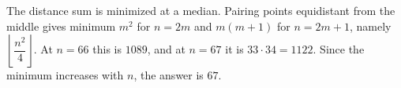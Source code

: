 The distance sum is minimized at a median. Pairing points equidistant from the middle gives minimum $m^2$ for $n=2m$ and $m(m+1)$ for $n=2m+1$, namely $\left\lfloor\dfrac{n^2}{4}\right\rfloor$. At $n=66$ this is $1089$, and at $n=67$ it is $33\cdot34=1122$. Since the minimum increases with $n$, the answer is $\boxed{67}$.
